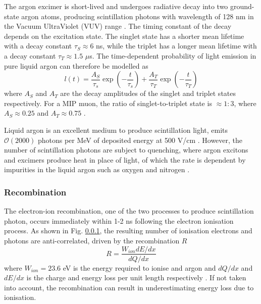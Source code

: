 The argon excimer is short-lived and undergoes radiative decay into two ground-state argon atoms, producing scintillation photons with wavelength of 128 nm in the Vacuum UltraViolet (VUV) range \cite{}.
The timing constant of the decay depends on the excitation state.
The singlet state has a shorter mean lifetime with a decay constant $\tau_{S} \approx 6$ ns, while the triplet has a longer mean lifetime with a decay constant $\tau_{T} \approx 1.5$ $\mu$s.
The time-dependent probability of light emission in pure liquid argon can therefore be modelled as
\begin{equation}
	l(t)=\frac{A_{S}}{\tau_{s}}\exp{\left(-\frac{t}{\tau_{s}}\right)} +\frac{A_{T}}{\tau_{T}}\exp{\left(-\frac{t}{\tau_{T}}\right)}
\end{equation}
where $A_{S}$ and $A_{T}$ are the decay amplitudes of the singlet and triplet states respectively. For a MIP muon, the ratio of singlet-to-triplet state is $\approx 1:3$, where $A_{S} \approx 0.25$ and $A_{T} \approx 0.75$ \cite{}.

Liquid argon is an excellent medium to produce scintillation light, emits $\mathcal{O}(2000)$ photons per MeV of deposited energy at 500 V/cm \cite{}.
However, the number of scintillation photons are subject to quenching, where argon excitons and excimers produce heat in place of light, of which the rate is dependent by impurities in the liquid argon such as oxygen and nitrogen \cite{}.

\subsubsection{Recombination}


The electron-ion recombination, one of the two processes to produce scintillation photon, occurs immediately within 1-2 ns following the electron ionisation process.
As shown in Fig. \ref{}, the resulting number of ionisation electrons and photons are anti-correlated, driven by the recombination $R$ 
\begin{equation}
	R=\frac{W_{ion} dE/dx}{dQ/dx}
\end{equation}
where $W_{ion} = 23.6$ eV is the energy required to ionise and argon and $dQ/dx$ and $dE/dx$ is the charge and energy loss per unit length respectively \cite{}. 
If not taken into account, the recombination can result in underestimating energy loss due to ionisation.

